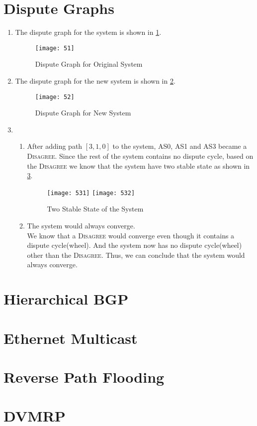 \documentclass[12pt,titlepage,letterpaper]{article}
\begin{document}
\section{Dispute Graphs}
\begin{enumerate}[label=\bfseries\alph*)]
    \item The dispute graph for the system is shown in \cref{51}.
        \begin{figure}[H]
            \centering
            \caption{Dispute Graph for Original System}\label{51}
            \texttt{[image: 51]}
        \end{figure}
    \item The dispute graph for the new system is shown in \cref{52}.
        \begin{figure}[H]
            \centering
            \caption{Dispute Graph for New System}\label{52}
            \texttt{[image: 52]}
        \end{figure}
    \item
        \begin{enumerate}[label=\roman*. ]
            \item After adding path $[3,1,0]$ to the system, AS0, AS1 and AS3
                became a \textsc{Disagree}.
                Since the rest of the system contains no dispute cycle,
                based on the \textsc{Disagree} we know that
                the system have two stable state as shown in \cref{53}.
                \begin{figure}[H]
                    \centering
                \caption{Two Stable State of the System}\label{53}
                    \texttt{[image: 531]}
                    \hfill
                    \texttt{[image: 532]}
                \end{figure}
            \item The system would always converge.\\
                We know that a \textsc{Disagree} would converge even though it
                contains a dispute cycle(wheel). And the system now has no
                dispute cycle(wheel) other than the \textsc{Disagree}.
                Thus, we can conclude that the system would always converge.
        \end{enumerate}
\end{enumerate}

\section{Hierarchical BGP}

\section{Ethernet Multicast}

\section{Reverse Path Flooding}

\section{DVMRP}
\end{document}
